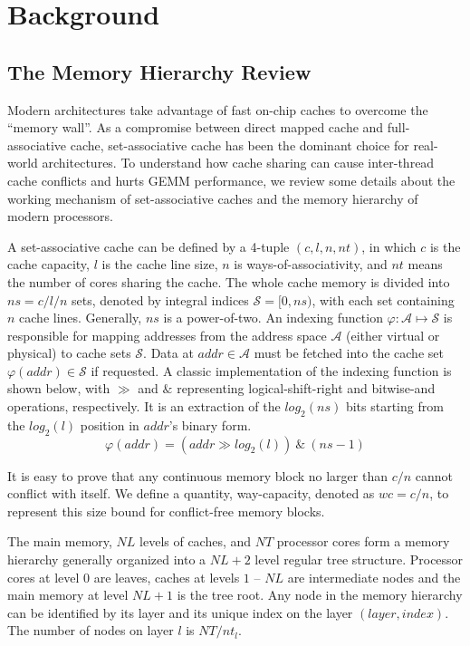 \section{Background}\label{sec:background}

\subsection{The Memory Hierarchy Review}\label{subsec:hierachy}

Modern architectures take advantage of fast on-chip caches
to overcome the ``memory wall''.
As a compromise between direct mapped cache and full-associative cache,
set-associative cache has been the dominant choice for real-world architectures.
To understand how cache sharing can cause inter-thread cache conflicts
and hurts GEMM performance, we review some details
about the working mechanism of set-associative caches and
the memory hierarchy of modern processors.

A set-associative cache can be defined by a 4-tuple $(c, l, n, nt)$,
in which $c$ is the cache capacity, $l$ is the cache line size,
$n$ is ways-of-associativity,
and $nt$ means the number of cores sharing the cache.
The whole cache memory is divided into $ns=c/l/n$ sets,
denoted by integral indices $\mathcal{S} = [0, ns)$,
with each set containing $n$ cache lines.
Generally, $ns$ is a power-of-two.
An indexing function $\varphi: \mathcal{A} \mapsto \mathcal{S}$ is responsible for
mapping addresses from the address space $\mathcal{A}$
(either virtual or physical) to cache sets $\mathcal{S}$.
Data at $addr \in \mathcal{A}$ must be fetched
into the cache set $\varphi(addr) \in \mathcal{S}$ if requested.
A classic implementation of the indexing function is shown below,
with $\gg$ and $\&$ representing logical-shift-right and bitwise-and operations, respectively.
It is an extraction of the $log_2(ns)$ bits starting from the $log_2(l)$
position in $addr$'s binary form.
\begin{equation*}
  \varphi(addr) = (addr \gg log_2(l)) ~\&~ (ns-1)
  \label{eq:phi}
\end{equation*}

It is easy to prove that any continuous memory block no larger than $c/n$
cannot conflict with itself.
We define a quantity, way-capacity, denoted as $wc=c/n$,
to represent this size bound for conflict-free memory blocks.

The main memory, $NL$ levels of caches, and $NT$ processor cores
form a memory hierarchy generally organized into
a $NL+2$ level regular tree structure.
Processor cores at level $0$ are leaves,
caches at levels $1$ -- $NL$ are intermediate nodes
and the main memory at level $NL+1$ is the tree root.
Any node in the memory hierarchy can be identified by
its layer and its unique index on the layer $(layer, index)$.
The number of nodes on layer $l$ is $NT / nt_l$.

